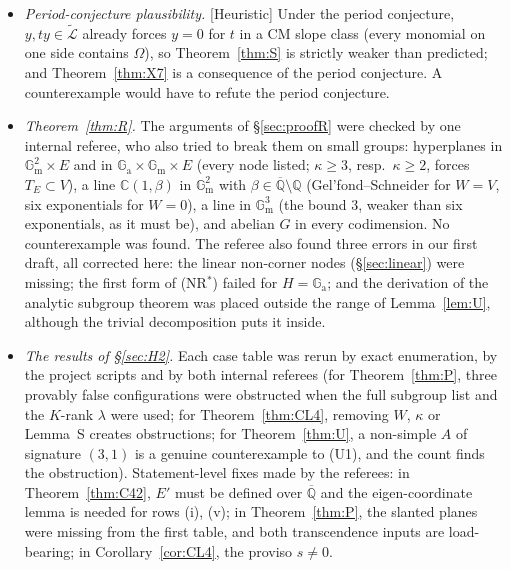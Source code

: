 \documentclass[11pt]{amsart}
\theoremstyle{definition}
\newcommand{\Qb}{\overline{\mathbb{Q}}}
\newcommand{\C}{\mathbb{C}}
\newcommand{\Q}{\mathbb{Q}}
\newcommand{\Ga}{\mathbb{G}_{\mathrm a}}
\newcommand{\Gm}{\mathbb{G}_{\mathrm m}}
\newcommand{\Lt}{\widetilde{\mathcal{L}}}
\newcommand{\lab}[1]{\textup{[#1]}}
\begin{document}
\begin{itemize}
$x\mapsto1-x$, and the pipeline returns $(z_2/z_1)/(B_2/B_1)=1$ to working precision (with the $P_j$ of \S\ref{sec:X7}
this ratio is $1/(1+\zeta)$). PSLQ on $\{1,B_2,B_3,B_3/B_1\}\otimes\{1,\mu,\mu^2\}$ finds no relation with coefficients
$\le10^{14}$, while the positive control $\{B_1B_2,B_3B(\frac17,\frac27),B_1,B_3\}$ finds (\ref{eq:R}) at once.
\item \emph{Period-conjecture plausibility.} \lab{Heuristic} Under the period conjecture, $y,ty\in\Lt$ already forces $y=0$ for
$t$ in a CM slope class (every monomial on one side contains $\Omega$), so Theorem~\ref{thm:S} is strictly weaker than
predicted; and Theorem~\ref{thm:X7} is a consequence of the period conjecture. A counterexample would have to refute the period
conjecture.
\item \emph{Theorem~\ref{thm:R}.} The arguments of \S\ref{sec:proofR} were checked by one internal referee, who also tried
to break them on small groups: hyperplanes in $\Gm^2\times E$ and in $\Ga\times\Gm\times E$ (every node listed;
$\kappa\ge3$, resp.\ $\kappa\ge2$, forces $T_E\subset V$), a line $\C(1,\beta)$ in $\Gm^2$ with $\beta\in\Qb\setminus\Q$
(Gel'fond--Schneider for $W=V$, six exponentials for $W=0$), a line in $\Gm^3$ (the bound $3$, weaker than six exponentials,
as it must be), and abelian $G$ in every codimension. No counterexample was found. The referee also found three errors in our
first draft, all corrected here: the linear non-corner nodes (\S\ref{sec:linear}) were missing; the first form of (NR$^*$)
failed for $H=\Ga$; and the derivation of the analytic subgroup theorem was placed outside the range of Lemma~\ref{lem:U},
although the trivial decomposition puts it inside.
\item \emph{The results of \S\ref{sec:H2}.} Each case table was rerun by exact enumeration, by the project scripts and by
both internal referees (for Theorem~\ref{thm:P}, three provably false configurations were obstructed when the full subgroup
list and the $K$-rank $\lambda$ were used; for Theorem~\ref{thm:CL4}, removing $W$, $\kappa$ or Lemma~S creates obstructions;
for Theorem~\ref{thm:U}, a non-simple $A$ of signature $(3,1)$ is a genuine counterexample to (U1), and the count finds the
obstruction). Statement-level fixes made by the referees: in Theorem~\ref{thm:C42}, $E'$ must be defined over $\Qb$ and the
eigen-coordinate lemma is needed for rows (i), (v); in Theorem~\ref{thm:P}, the slanted planes were missing from the first
table, and both transcendence inputs are load-bearing; in Corollary~\ref{cor:CL4}, the proviso $s\ne0$.
\end{itemize}
\end{document}
